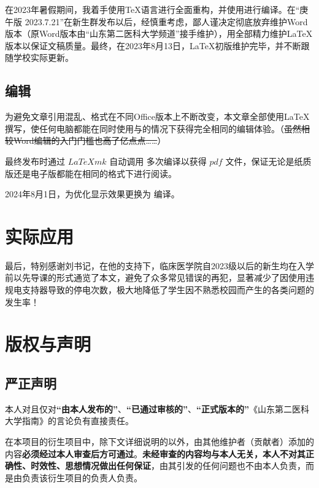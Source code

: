 在2023年暑假期间，我着手使用\TeX 语言进行全面重构，并使用\XeLaTeX 进行编译。在“庚午版 2023.7.21”在新生群发布以后，经慎重考虑，鄙人谨决定彻底放弃维护Word版本（原Word版本由“山东第二医科大学频道”接手维护），用全部精力维护\LaTeX 版本以保证文稿质量。最终，在2023年8月13日，\LaTeX 初版维护完毕，并不断跟随学校实际更新。

\subsection[编辑]{编辑}
为避免文章引用混乱、格式在不同Office版本上不断改变，本文章全部使用\LaTeX 撰写，使任何电脑都能在同时使用与\footnotemark 的情况下获得完全相同的编辑体验。（\st{虽然相较Word编辑的入门门槛也高了亿点点……}）

最终发布时通过 $LaTeXmk$ 自动调用 \XeTeX 多次编译以获得 $pdf$ 文件，保证无论是纸质版还是电子版都能在相同的格式下进行阅读。

2024年8月1日，为优化显示效果更换为 \LuaTeX 编译。

\section[实际应用]{实际应用}
最后，特别感谢刘书记，在他的支持下，临床医学院自2023级以后的新生均在入学前以先导课的形式通览了本文，避免了众多常见错误的再犯，显著减少了因使用违规电支持器导致的停电次数，极大地降低了学生因不熟悉校园而产生的各类问题的发生率！

\section[版权与声明]{版权与声明}
\subsection[严正声明]{严正声明}
本人对且仅对\textbf{“由本人发布的”}、\textbf{“已通过审核的”}、\textbf{“正式版本的”}《山东第二医科大学指南》的言论负有直接责任。

在本项目的衍生项目中，除下文详细说明的以外，由其他维护者（贡献者）添加的内容\textbf{必须经过本人审查后方可通过}。\textbf{未经审查的内容均与本人无关，本人不对其正确性、时效性、思想情况做出任何保证}，由其引发的任何问题也不由本人负责，而是由负责该衍生项目的负责人负责。

